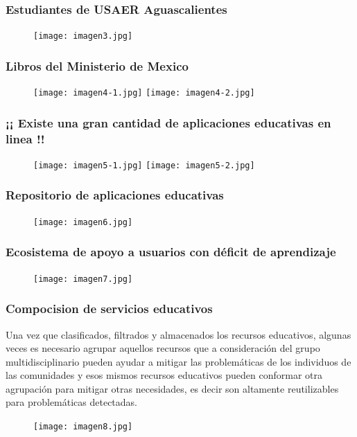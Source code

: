 \documentclass[11pt]{beamer}
\begin{document}
\begin{frame}
\frametitle{Estudiantes de USAER Aguascalientes}
    \begin{figure}
    \centering
     \texttt{[image: imagen3.jpg]} 
    \end{figure}
\end{frame}

\begin{frame}
\frametitle{Libros del Ministerio de Mexico}
    \begin{figure}
    \centering
     \texttt{[image: imagen4-1.jpg]}
     \texttt{[image: imagen4-2.jpg]}
    \end{figure}
\end{frame}

\begin{frame}
\frametitle{¡¡ Existe una gran cantidad de aplicaciones educativas en linea !!}
    \begin{figure}
    \centering
     \texttt{[image: imagen5-1.jpg]}
     \texttt{[image: imagen5-2.jpg]}
    \end{figure}
\end{frame}

\begin{frame}
\frametitle{Repositorio de aplicaciones educativas}
    \begin{figure}
    \centering
     \texttt{[image: imagen6.jpg]}
    \end{figure}
\end{frame}

\begin{frame}
\frametitle{Ecosistema de apoyo a usuarios con déficit de aprendizaje}
    \begin{figure}
    \centering
     \texttt{[image: imagen7.jpg]}
    \end{figure}
\end{frame}

\begin{frame}
\frametitle{Compocision de servicios educativos}
    \justify
    Una vez que clasificados, filtrados y almacenados los recursos educativos, algunas veces es necesario agrupar aquellos recursos que a consideración del grupo multidisciplinario pueden ayudar a mitigar las problemáticas de los individuos de las comunidades y esos mismos recursos educativos pueden conformar otra agrupación para mitigar otras necesidades, es decir son altamente reutilizables para problemáticas detectadas.
    \par
    \begin{figure}
    \centering
     \texttt{[image: imagen8.jpg]}
    \end{figure}
\end{frame}
\end{document}
